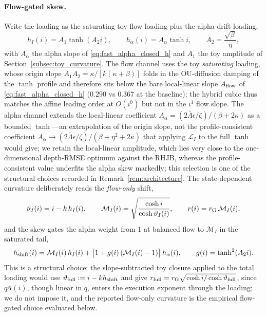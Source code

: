 \documentclass[11pt,a4paper]{article}
\newcommand{\Lcal}{\mathcal{L}}
\newcommand{\alphabar}{\bar\alpha}
\theoremstyle{plain}
\theoremstyle{definition}
\begin{document}
\paragraph{Flow-gated skew.}
Write the loading as the saturating toy flow loading plus the alpha-drift loading,
\begin{equation}
h_I(i)=A_1\tanh(A_2 i),\qquad h_\alpha(i)=A_\alpha\tanh i,\qquad A_2=\frac{\sqrt\beta}{\eta},
\label{eq:fa_selfcons_loadings}
\end{equation}
with \(A_\alpha\) the alpha slope of \eqref{eq:fast_alpha_closed_h} and
\(A_1\) the toy amplitude of Section~\ref{subsec:toy_curvature}.  The flow
channel uses the toy \emph{saturating} loading, whose origin slope
\(A_1A_2=\kappa/[k(\kappa+\beta)]\) folds in the OU-diffusion damping of the
\(\tanh\) profile and therefore sits below the bare local-linear slope
\(A_{\rm flow}\) of \eqref{eq:fast_alpha_closed_h} (\(0.290\) vs \(0.367\) at
the baseline); the hybrid cubic thus matches the affine leading order at
\(O(i^0)\) but not in the \(i^1\) flow slope.  The alpha channel extends the
local-linear coefficient \(A_\alpha=(2\bar\Lambda\epsilon/\zeta)/(\beta+2\kappa)\)
as a bounded \(\tanh\)---an extrapolation of the origin slope, not the
profile-consistent coefficient
\(A_\alpha\to(2\bar\Lambda\epsilon/\zeta)/(\beta+\eta^2+2\kappa)\) that applying
\(\Lcal_I\) to the full \(\tanh\) would give; we retain the local-linear
amplitude, which lies very close to the one-dimensional depth-RMSE optimum
against the RHJB, whereas the profile-consistent value underfits the alpha skew
markedly; this selection is one of the structural choices recorded in
Remark~\ref{rem:architecture}.  The state-dependent curvature deliberately reads the
\emph{flow-only} shift,
\begin{equation}
\vartheta_I(i)=i-k\,h_I(i),\qquad
\mathcal M_I(i)=\sqrt{\frac{\cosh i}{\cosh\vartheta_I(i)}},\qquad
r(i)=r_{\rm G}\,\mathcal M_I(i),
\label{eq:fa_selfcons_curv}
\end{equation}
and the skew gates the alpha weight from \(1\) at balanced flow to
\(\mathcal M_I\) in the saturated tail,
\begin{equation}
h_{\rm shift}(i)=\mathcal M_I(i)\,h_I(i)
+\bigl[1+g(i)\,(\mathcal M_I(i)-1)\bigr]\,h_\alpha(i),
\qquad g(i)=\tanh^2(A_2 i).
\label{eq:fa_selfcons_shift}
\end{equation}
This is a structural choice: the slope-subtracted toy closure applied to the
total loading would use \(\vartheta_{\rm full}:=i-kh_{\rm shift}\) and give
\(r_{\rm full}=r_{\rm G}\sqrt{\cosh i/\cosh\vartheta_{\rm full}}\), since
\(q\alphabar(i)\), though linear in \(q\), enters the execution exponent
through the loading; we do not impose it, and the reported flow-only
curvature is the empirical flow-gated choice evaluated below.
\end{document}
